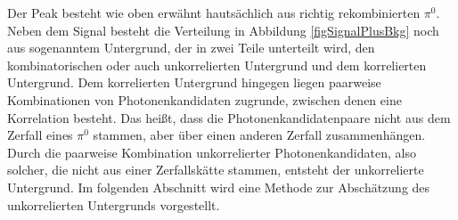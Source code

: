 Der Peak besteht wie oben erw\"ahnt hauts\"achlich aus richtig rekombinierten $\pi^{0}$.
Neben dem Signal besteht die Verteilung in Abbildung \ref{figSignalPlusBkg} noch aus sogenanntem Untergrund, der in zwei Teile unterteilt wird, den kombinatorischen oder auch unkorrelierten Untergrund und dem korrelierten Untergrund.
Dem korrelierten Untergrund hingegen liegen paarweise Kombinationen von Photonenkandidaten zugrunde, zwischen denen eine Korrelation besteht.
Das hei{\ss}t, dass die Photonenkandidatenpaare nicht aus dem Zerfall eines $\pi^{0}$ stammen, aber \"uber einen anderen Zerfall zusammenh\"angen.
Durch die paarweise Kombination unkorrelierter Photonenkandidaten, also solcher, die nicht aus einer Zerfallsk\"atte stammen, entsteht der unkorrelierte Untergrund.
\newline
Im folgenden Abschnitt wird eine Methode zur Absch\"atzung des unkorrelierten Untergrunds vorgestellt. 